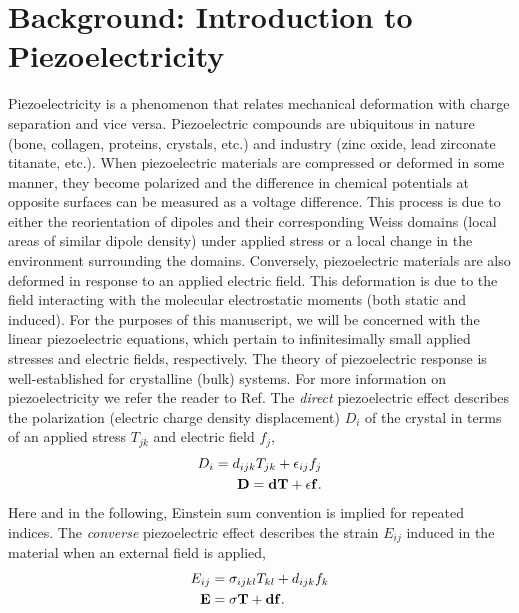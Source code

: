 \section{Background: Introduction to Piezoelectricity}


Piezoelectricity is a phenomenon that relates mechanical deformation with charge separation and vice versa.  Piezoelectric compounds are ubiquitous in nature (bone, collagen, proteins, crystals, etc.) and 
industry (zinc oxide, lead zirconate titanate, etc.).  
When piezoelectric materials are compressed or deformed in some
manner, they become polarized and the difference in chemical potentials at opposite surfaces can be measured
as a voltage difference.  
This process is due to either the reorientation of dipoles and their corresponding Weiss domains (local areas of similar dipole density) under applied stress or a local 
change in the environment surrounding the domains.
Conversely, piezoelectric materials are also deformed in response to an applied electric field. This deformation is due
to the field interacting with the molecular electrostatic moments (both static and induced). 
For the purposes of this manuscript, we will be concerned with the linear piezoelectric equations, which pertain to
infinitesimally small applied stresses and electric fields, respectively.   
The theory of piezoelectric response is well-established for crystalline (bulk) systems. 
For more information on piezoelectricity we refer the reader to Ref. \cite{ieeePiezo,Martin1972, Cohen:2008gh}
The {\em direct} piezoelectric effect describes the polarization (electric charge density displacement) $D_{i}$ of the crystal in terms of an applied
stress $T_{jk}$ and electric field $f_j$, %
\begin{equation}
\begin{aligned}
\label{eq:direct}
D_i = d_{ijk}T_{jk}+\epsilon_{ij}f_j \\
\bf{D} = \bf{dT}+\bf{\epsilon f}.
\end{aligned}
\end{equation}
Here and in the following, Einstein sum convention is implied for repeated indices. 
The {\em converse} piezoelectric effect describes the strain $E_{ij}$ 
induced in the material when an external field is applied, %
\begin{equation}
\begin{aligned}
\label{eq:convers}
E_{ij} &= \sigma_{ijkl}T_{kl}+d_{ijk}f_k \\
\bf{E} &= \bf{\sigma T}+\bf{df}. 
\end{aligned}
\end{equation}
